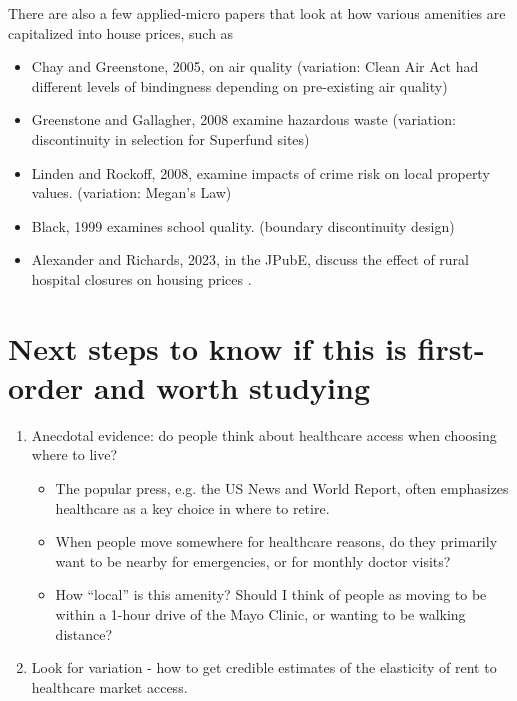 \documentclass[11pt]{article}
\begin{document}
There are also a few applied-micro papers that look at how various amenities are capitalized into house prices, such as 

\begin{itemize}
\item    Chay and Greenstone, 2005, on air quality (variation: Clean Air Act had different levels of bindingness depending on pre-existing air quality)
\item Greenstone and Gallagher, 2008 examine hazardous waste (variation: discontinuity in selection for Superfund sites)
\item  Linden and Rockoff, 2008, examine impacts of crime risk on local property values.  (variation: Megan's Law)

\item Black, 1999 examines school quality. (boundary discontinuity design)
\item Alexander and Richards, 2023, in the JPubE, discuss the effect of rural hospital closures on housing prices . 
\end{itemize}



\section{Next steps to know if this is first-order and worth studying}

\begin{enumerate}
\item Anecdotal evidence: do people think about healthcare access when choosing where to live? 
\begin{itemize}
    \item The popular press, e.g. the US News and World Report, often emphasizes healthcare as a key choice in where to retire. 
\item When people move somewhere for healthcare reasons, do they primarily want to be nearby for emergencies, or for monthly doctor visits? 
\item How ``local'' is this amenity? Should I think of people as moving to be within a 1-hour drive of the Mayo Clinic, or wanting to be walking distance?
\end{itemize}
\item Look for variation - how to get credible estimates of the elasticity of rent to healthcare market access.
\end{enumerate}
\end{document}
